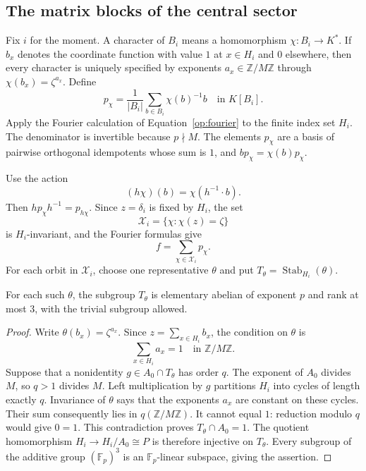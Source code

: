 \subsection{The matrix blocks of the central sector}

Fix $i$ for the moment.  A character of $B_i$ means a homomorphism
$\chi:B_i\to K^*$.  If $b_x$ denotes the coordinate function with
value $1$ at $x\in H_i$ and $0$ elsewhere, then every character is
uniquely specified by exponents $a_x\in\mathbb Z/M\mathbb Z$ through
$\chi(b_x)=\zeta^{a_x}$.  Define
\[
 p_\chi=\frac1{|B_i|}\sum_{b\in B_i}\chi(b)^{-1}b
 \quad\text{in }K[B_i].
\]
Apply the Fourier calculation of Equation~\eqref{op:fourier}
to the finite index set $H_i$. The denominator is invertible because
$p\nmid M$. The elements $p_\chi$ are a basis of pairwise orthogonal
idempotents whose sum is $1$, and $bp_\chi=\chi(b)p_\chi$.

Use the action
\[
 (h\chi)(b)=\chi(h^{-1}\cdot b).
\]
Then $hp_\chi h^{-1}=p_{h\chi}$.  Since $z=\delta_i$ is fixed by
$H_i$, the set
\[
 \mathcal X_i=\{\chi:\chi(z)=\zeta\}
\]
is $H_i$-invariant, and the Fourier formulas give
\begin{equation}\label{eq:sector-fourier-f}
 f=\sum_{\chi\in\mathcal X_i}p_\chi.
\end{equation}
For each orbit in $\mathcal X_i$, choose one representative $\theta$
and put $T_\theta=\operatorname{Stab}_{H_i}(\theta)$.

\begin{lemma}\label{lem:sector-stabilizers}
For each such $\theta$, the subgroup $T_\theta$ is elementary abelian
of exponent $p$ and rank at most $3$, with the trivial subgroup allowed.
\end{lemma}

\begin{proof}
Write $\theta(b_x)=\zeta^{a_x}$.  Since
$z=\sum_{x\in H_i}b_x$, the condition on $\theta$ is
\[
 \sum_{x\in H_i}a_x=1\quad\text{in }\mathbb Z/M\mathbb Z.
\]
Suppose that a nonidentity $g\in A_0\cap T_\theta$ has order $q$.
The exponent of $A_0$ divides $M$, so $q>1$ divides $M$. Left
multiplication by $g$ partitions $H_i$ into cycles of length exactly
$q$.  Invariance of $\theta$ says that the exponents $a_x$ are
constant on these cycles.  Their sum consequently lies in
$q(\mathbb Z/M\mathbb Z)$.  It cannot equal $1$: reduction modulo
$q$ would give $0=1$.  This contradiction proves
$T_\theta\cap A_0=1$. The quotient homomorphism
$H_i\to H_i/A_0\cong P$ is therefore injective on $T_\theta$.
Every subgroup of the additive group $(\mathbb F_p)^3$ is an
$\mathbb F_p$-linear subspace, giving the assertion.
\end{proof}

